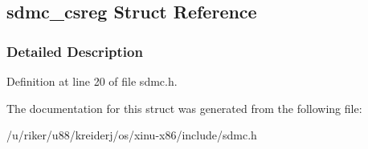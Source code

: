 \hypertarget{structsdmc__csreg}{}\subsection{sdmc\+\_\+csreg Struct Reference}
\label{structsdmc__csreg}


\subsubsection{Detailed Description}


Definition at line 20 of file sdmc.\+h.



The documentation for this struct was generated from the following file\+:\begin{DoxyCompactItemize}
\item 
/u/riker/u88/kreiderj/os/xinu-\/x86/include/sdmc.\+h\end{DoxyCompactItemize}
